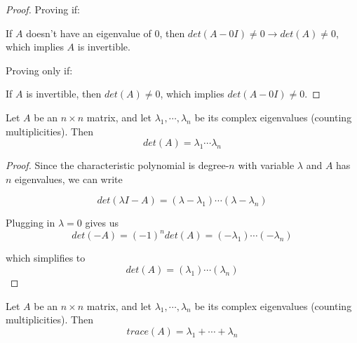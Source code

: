 \begin{proof}
Proving if: 

If $A$ doesn't have an eigenvalue of 0, then $det(A - 0I) \neq 0 \rightarrow det(A) \neq 0$, which implies $A$ is invertible. 

Proving only if: 

If $A$ is invertible, then $det(A) \neq 0$, which implies $det(A - 0I) \neq 0$. 
\end{proof}

\begin{theorem}
Let $A$ be an $n \times n$ matrix, and let $\lambda_{1}, \cdots, \lambda_{n}$ be its complex eigenvalues (counting multiplicities). Then
$$det(A) = \lambda_{1} \cdots \lambda_{n}$$
\end{theorem}


\begin{proof}
Since the characteristic polynomial is degree-$n$ with variable $\lambda$ and $A$ has $n$ eigenvalues, we can write 

$$det(\lambda I - A) = (\lambda - \lambda_{1}) \cdots (\lambda - \lambda_{n})$$

Plugging in $\lambda = 0$ gives us 
$$det(-A) = (-1)^{n} det(A) = (- \lambda_{1}) \cdots (- \lambda_{n})$$ 

which simplifies to 
$$det(A) = (\lambda_{1}) \cdots (\lambda_{n})$$
\end{proof}


\begin{theorem}
Let $A$ be an $n \times n$ matrix, and let $\lambda_{1}, \cdots, \lambda_{n}$ be its complex eigenvalues (counting multiplicities). Then
$$trace(A) = \lambda_{1} + \cdots + \lambda_{n}$$ 
\end{theorem}

